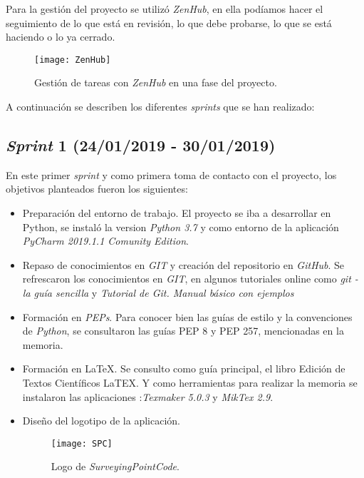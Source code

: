 Para la gestión del proyecto se utilizó \emph{ZenHub}, en ella podíamos hacer el seguimiento de lo que está en revisión, lo que debe probarse, lo que se está haciendo o lo ya cerrado.


\begin{figure}[H]
	\centering
	\texttt{[image: ZenHub]}
	\caption{Gestión de tareas con \emph{ZenHub} en una fase del proyecto.}
	\label{fig:ZenHub}
\end{figure}

A continuación se describen los diferentes \emph{sprints} que se han realizado:

\subsection{\emph{Sprint} 1 (24/01/2019 - 30/01/2019)}

En este primer \emph{sprint} y como primera toma de contacto con el proyecto, los objetivos planteados fueron los siguientes:

\begin{itemize}
\item Preparación del entorno de trabajo. El proyecto se iba a desarrollar en Python, se instaló la version \emph{Python 3.7} y como entorno de  la aplicación \emph{PyCharm 2019.1.1 Comunity Edition}.

\item Repaso de conocimientos en \emph{GIT} y creación del repositorio en \emph{GitHub}. Se refrescaron los conocimientos en \emph{GIT}, en algunos tutoriales  online como  \textit{git - la guía sencilla} \cite{git} y \textit{Tutorial de Git. Manual básico con ejemplos} \cite{git_1}

\item Formación en \emph{PEPs}. Para conocer bien las guías de estilo y la convenciones de \emph{Python}, se consultaron las guías PEP 8 y PEP 257, mencionadas en la memoria.

\item Formación en \LaTeX. Se consulto como guía principal, el libro Edición de Textos Científicos LaTEX\cite{latex}. Y como herramientas para realizar la memoria se instalaron las aplicaciones :\emph{Texmaker 5.0.3} y \emph{MikTex 2.9}.

\item Diseño del logotipo de la aplicación.

\begin{figure}[H]
	\centering
	\texttt{[image: SPC]}
	\caption{Logo de \emph{SurveyingPointCode}.}
	\label{fig:SPC}
\end{figure}
 
\end{itemize}


